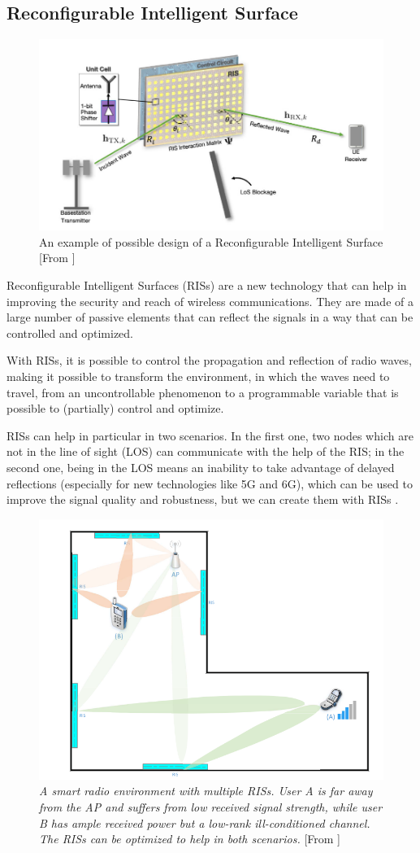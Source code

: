 \subsection{Reconfigurable Intelligent Surface}

\begin{figure}[H]
  \centering
  \includegraphics[width=0.5\linewidth]{imgs/RIS model.png}
  \caption{An example of possible design of a Reconfigurable Intelligent Surface [From \cite{9732917}]}
\end{figure}

Reconfigurable Intelligent Surfaces (RISs) are a new technology that can help in improving the security and reach of wireless communications. They are made of a large number of passive elements that can reflect the signals in a way that can be controlled and optimized.

With RISs, it is possible to control the propagation and reflection of radio waves, making it possible to transform the environment, in which the waves need to travel, from an uncontrollable phenomenon to a programmable variable that is possible to (partially) control and optimize.

RISs can help in particular in two scenarios. In the first one, two nodes which are not in the line of sight (LOS) can communicate with the help of the RIS; in the second one, being in the LOS means an inability to take advantage of delayed reflections (especially for new technologies like 5G and 6G), which can be used to improve the signal quality and robustness, but we can create them with RISs \cite{9086766}.

\begin{figure}[H]
  \centering
  \includegraphics[width=0.5\linewidth]{imgs/RIS enviroment.png}
  \caption{\textit{A smart radio environment with multiple RISs. User A is far away
      from the AP and suffers from low received signal strength, while user B has
      ample received power but a low-rank ill-conditioned channel. The RISs can
      be optimized to help in both scenarios.} [From \cite{9086766}]}
\end{figure}

